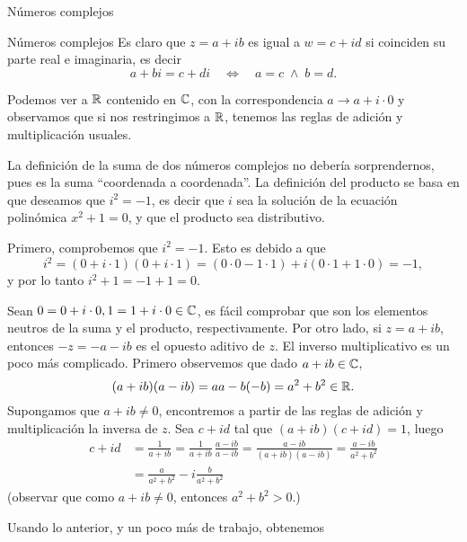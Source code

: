 \begin{chapter}{N\'umeros complejos}
\begin{section}{N\'umeros complejos}
        Es claro  que $z=a+ib$ es igual a $w = c+id$ si coinciden su parte real e imaginaria, es decir
        \begin{equation*}
        a+ bi = c+ di\quad \Leftrightarrow\quad a=c \;\wedge\; b = d.
        \end{equation*}
        
        Podemos  ver a $\mathbb R$ contenido en $\mathbb C$,  con la correspondencia $a \to a + i \cdot 0$ y  observamos que si  nos restringimos a $\mathbb R$, tenemos las reglas de adición y  multiplicación usuales.  
        
        La definición de la suma de dos números complejos no debería sorprendernos, pues es la suma ``coordenada a coordenada''. La definición del producto se basa en que deseamos que $i^2 = -1$,  es decir que $i$  sea la solución de la ecuación polinómica $x^2 + 1 =0$,   y que el producto sea distributivo. 	
        
        Primero, comprobemos que  $i^2 = -1$. Esto es debido a que
        \begin{equation*}
        i^2 = (0 + i\cdot 1)(0 + i\cdot 1) = (0\cdot 0 - 1 \cdot 1) + i(0\cdot 1 + 1 \cdot 0) = -1,
        \end{equation*} 
        y por lo tanto $i^2 + 1 = -1+1 = 0$.  
        
        
        Sean $0 = 0 + i\cdot 0, 1 = 1 + i\cdot 0 \in \mathbb C$,  es fácil comprobar que son los elementos neutros de la suma y el producto,  respectivamente. Por otro lado, si $z = a + ib$,  entonces $-z = -a -ib$ es el opuesto aditivo de $z$. 
        El inverso multiplicativo es un poco más complicado. Primero observemos que dado $a+ib \in \mathbb C$,
        \begin{equation*}
        (a+ ib)(a-ib) = aa -b(-b) = a^2 + b^2 \in \mathbb R. 
        \end{equation*}
        Supongamos que $a+ib\ne0$,  encontremos  a partir  de las reglas de adición y multiplicación la inversa de $z$. Sea $c+id$ tal que $(a+ib)(c+id)=1$, luego
        \begin{align*}
        c + id &= \frac{1}{a+ib} = \frac{1}{a+ib}\,\frac{a-ib}{a-ib} = \frac{a-ib}{(a+ib)(a-ib)} = 
        \frac{a-ib}{ a^2 + b^2} \\
        &= \frac{a}{ a^2 + b^2} - i\frac{b}{ a^2 + b^2}
        \end{align*}  
        (observar que como $a+ib\ne0$,  entonces $a^2 + b^2 >0$.)
        
        Usando lo anterior,  y un poco más de trabajo, obtenemos
        

\end{section}
\end{chapter}
